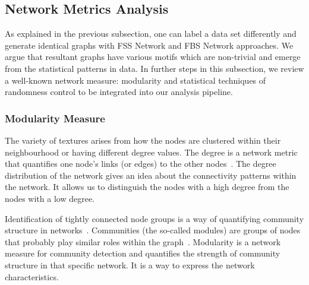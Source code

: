 \subsection*{Network Metrics Analysis}
%
As explained in the previous subsection, one can label a data set differently and generate identical graphs with FSS Network and FBS Network approaches. We argue that resultant graphs have various motifs which are non-trivial and emerge from the statistical patterns in data. In further steps in this subsection, we review a well-known network measure: modularity and statistical techniques of randomness control to be integrated into our analysis pipeline.
\subsubsection*{Modularity Measure}
The variety of textures arises from how the nodes are clustered within their neighbourhood or having different degree values. The degree is a network metric that quantifies one node's links (or edges) to the other nodes~\cite{Barabasi2016}. The degree distribution of the network gives an idea about the connectivity patterns within the network. It allows us to distinguish the nodes with a high degree from the nodes with a low degree.

Identification of tightly connected node groups is a way of quantifying community structure in networks~\cite{Girvan7821}. Communities (the so-called modules) are groups of nodes that probably play similar roles within the graph~\cite{FORTUNATO201075}. Modularity is a network measure for community detection and quantifies the strength of community structure in that specific network. It is a way to express the network characteristics. 

